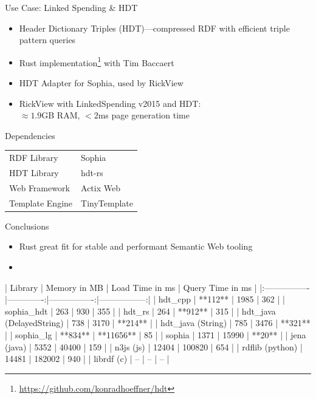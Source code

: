 \documentclass[14pt,aspectratio=169]{beamer}
\begin{document}
\begin{frame}{Use Case: Linked Spending \& HDT}
\begin{itemize}
\item Header Dictionary Triples (HDT)---compressed RDF with efficient triple pattern queries
\item Rust implementation\footnote{\url{https://github.com/konradhoeffner/hdt}} with Tim Baccaert
\item HDT Adapter for Sophia, used by RickView
\item RickView with LinkedSpending v2015 and HDT:\\$\approx 1.9$GB RAM,  $<2$ms page generation time
\end{itemize}
\end{frame}

\begin{frame}{Dependencies}
\begin{tabular}{ll}
RDF Library		&Sophia\\%
HDT Library		&hdt-rs\\
Web Framework	&Actix Web\\
Template Engine	&TinyTemplate\\
\end{tabular}
\end{frame}

\begin{frame}{Conclusions}
\begin{itemize}
\item Rust great fit for stable and performant Semantic Web tooling
\item 
\end{itemize}
\end{frame}

| Library         | Memory in MB | Load Time in ms | Query Time in ms |
|:----------------|-------------:|----------------:|-----------------:|
| hdt_cpp         |      **112** |            1985 |              362 |
| sophia_hdt      |          263 |             930 |              355 |
| hdt_rs          |          264 |         **912** |              315 |
| hdt_java (DelayedString) | 738 |            3170 |          **214** |
| hdt_java (String)        | 785 |            3476 |          **321** |
| sophia_lg       |      **834** |       **11656** |               85 |
| sophia          |         1371 |           15990 |           **20** |
| jena (java)     |         5352 |           40400 |              159 |
| n3js (js)       |        12404 |          100820 |              654 |
| rdflib (python) |        14481 |          182002 |              940 |
| librdf (c)      |           -- |              -- |               -- |
\fi
\end{document}
